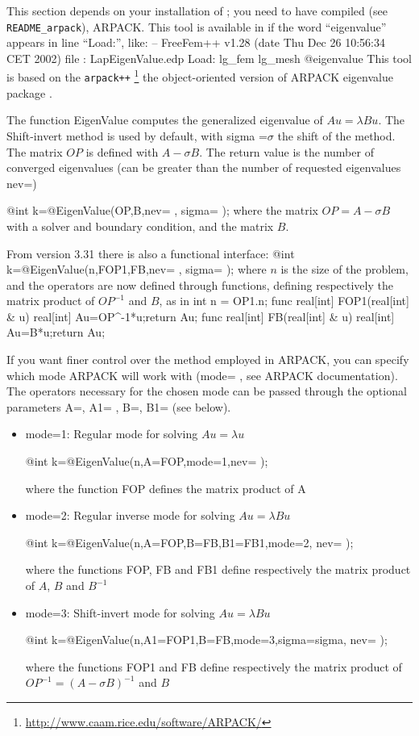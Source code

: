 \documentclass[a4paper,twoside,12pt]{book}
\begin{document}
This section depends on your installation of \freefempp; you need to have compiled (see \texttt{README\_arpack}),
ARPACK.
This tool is available in \freefempp  if the word ``eigenvalue'' appears in line ``Load:'', like:
\bFF
-- FreeFem++ v1.28 (date Thu Dec 26 10:56:34 CET 2002)
 file : LapEigenValue.edp
 Load: lg_fem lg_mesh @eigenvalue
\eFF
This tool is based on the \texttt{arpack++} \footnote{\url{http://www.caam.rice.edu/software/ARPACK/}}
the object-oriented version of ARPACK eigenvalue package \cite{arpack}.

The function EigenValue computes the generalized eigenvalue
of  $ A u = \lambda B u $. The Shift-invert method is used by default, with sigma =$\sigma$ the shift of the method.
The matrix  $ OP$ is defined with $ A - \sigma B $.
The return value is the number of converged eigenvalues (can be greater than the number of requested  eigenvalues nev=)

\bFF
@int k=@EigenValue(OP,B,nev= , sigma= );
\eFF
where the matrix $OP=  A - \sigma B $ with a solver and boundary condition,
and the matrix $B$.

From version 3.31 there is also a functional interface:
\bFF
@int k=@EigenValue(n,FOP1,FB,nev= , sigma= );
\eFF
where $n$ is the size of the problem,  and the operators are now defined through functions, defining respectively the matrix product of $OP^{-1}$ and $B$, as in 
\bFF
int n = OP1.n; 
func real[int] FOP1(real[int] & u) { real[int] Au=OP^-1*u;return Au;}
func real[int] FB(real[int] & u) { real[int] Au=B*u;return Au;}
\eFF

If you want finer control over the method employed in ARPACK, you can specify which mode ARPACK will work with (mode= , see ARPACK documentation). The operators necessary for the chosen mode can be passed through the optional parameters A=, A1= , B=, B1= (see below).

\begin{itemize}
\item mode=1: Regular mode for solving $ A u = \lambda u $

\bFF
         @int k=@EigenValue(n,A=FOP,mode=1,nev= );
\eFF

where the function FOP defines the matrix product of A

\item mode=2: Regular inverse mode for solving $ A u = \lambda B u $

\bFF
         @int k=@EigenValue(n,A=FOP,B=FB,B1=FB1,mode=2, nev= );
\eFF

where the functions FOP, FB and FB1 define respectively the matrix product of $A$, $B$ and $B^{-1}$

\item mode=3: Shift-invert mode for solving $ A u = \lambda B u $

\bFF
         @int k=@EigenValue(n,A1=FOP1,B=FB,mode=3,sigma=sigma, nev= );
\eFF

where the functions FOP1 and FB define respectively the matrix product of $OP^{-1} = (A - \sigma B)^{-1} $ and $B$

\end{itemize}
\end{document}
